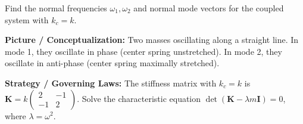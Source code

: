 \begin{psctexample}
Find the normal frequencies $\omega_1, \omega_2$ and normal mode vectors for the coupled system with $k_c = k$.

\textbf{\color{rbruNavy}Picture / Conceptualization:}
Two masses oscillating along a straight line. In mode 1, they oscillate in phase (center spring unstretched). In mode 2, they oscillate in anti-phase (center spring maximally stretched).

\textbf{\color{rbruNavy}Strategy / Governing Laws:}
The stiffness matrix with $k_c = k$ is $\mathbf{K} = k\begin{pmatrix} 2 & -1 \\ -1 & 2 \end{pmatrix}$.
Solve the characteristic equation $\det(\mathbf{K} - \lambda m \mathbf{I}) = 0$, where $\lambda = \omega^2$.


\end{psctexample}
